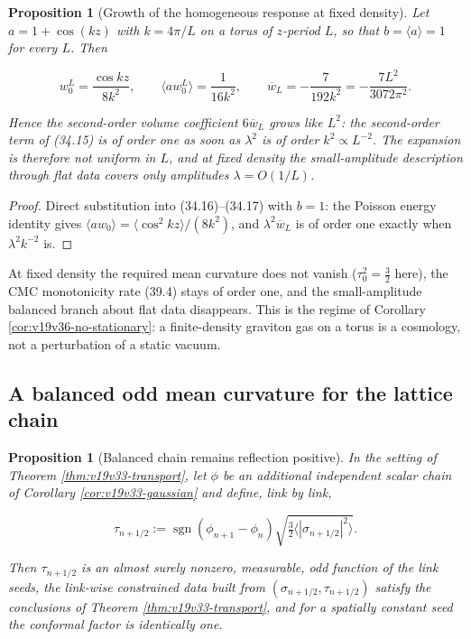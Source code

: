 \documentclass[11pt]{article}
\newtheorem{proposition}[theorem]{Proposition}
\theoremstyle{remark}
\begin{document}
\begin{proposition}[Growth of the homogeneous response at fixed density]
\label{prop:v19v37-density}
Let \(a=1+\cos(kz)\) with \(k=4\pi/L\) on a torus of \(z\)-period
\(L\), so that \(b=\langle a\rangle=1\) for every \(L\).  Then

\[
 w_0^L=\frac{\cos kz}{8k^2},\qquad
 \langle aw_0^L\rangle=\frac1{16k^2},\qquad
 \overline w_L=-\frac{7}{192k^2}=-\frac{7L^2}{3072\pi^2}.             \tag{40.8}
\]

Hence the second-order volume coefficient \(6\overline w_L\) grows like
\(L^2\): the second-order term of (34.15) is of order one as soon as
\(\lambda^2\) is of order \(k^2\propto L^{-2}\).  The expansion is
therefore not uniform in \(L\), and at fixed density the small-amplitude
description through flat data covers only amplitudes
\(\lambda=O(1/L)\).
\end{proposition}

\begin{proof}
Direct substitution into (34.16)--(34.17) with \(b=1\): the Poisson
energy identity gives \(\langle aw_0\rangle=\langle\cos^2kz\rangle/(8k^2)\),
and \(\lambda^2\overline w_L\) is of order one exactly when
\(\lambda^2k^{-2}\) is.
\end{proof}

At fixed density the required mean curvature does not vanish
(\(\tau_0^2=\tfrac32\) here), the CMC monotonicity rate (39.4) stays of
order one, and the small-amplitude balanced branch about flat data
disappears.  This is the regime of Corollary
\ref{cor:v19v36-no-stationary}: a finite-density graviton gas on a
torus is a cosmology, not a perturbation of a static vacuum.

\subsection{A balanced odd mean curvature for the lattice chain}

\begin{proposition}[Balanced chain remains reflection positive]
\label{prop:v19v37-balanced}
In the setting of Theorem \ref{thm:v19v33-transport}, let \(\phi\) be an
additional independent scalar chain of Corollary
\ref{cor:v19v33-gaussian} and define, link by link,

\[
 \tau_{n+1/2}:=\operatorname{sgn}(\phi_{n+1}-\phi_n)
 \sqrt{\tfrac32\langle|\sigma_{n+1/2}|^2\rangle}.                    \tag{40.9}
\]

Then \(\tau_{n+1/2}\) is an almost surely nonzero, measurable, odd
function of the link seeds, the link-wise constrained data built from
\((\sigma_{n+1/2},\tau_{n+1/2})\) satisfy the conclusions of Theorem
\ref{thm:v19v33-transport}, and for a spatially constant seed the
conformal factor is identically one.
\end{proposition}
\end{document}
